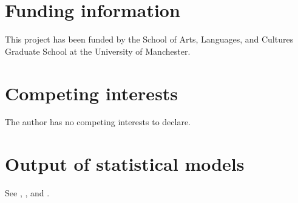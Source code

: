 \documentclass[charis]{glossa}
\begin{document}
\hypertarget{funding-information}{%
\section{Funding information}\label{funding-information}}

This project has been funded by the School of Arts, Languages, and
Cultures Graduate School at the University of Manchester.

\hypertarget{competing-interests}{%
\section{Competing interests}\label{competing-interests}}

The author has no competing interests to declare.

\appendix

\hypertarget{output-of-statistical-models}{%
\section{Output of statistical
models}\label{output-of-statistical-models}}

\label{a:stats}

See , , and
.
\end{document}
